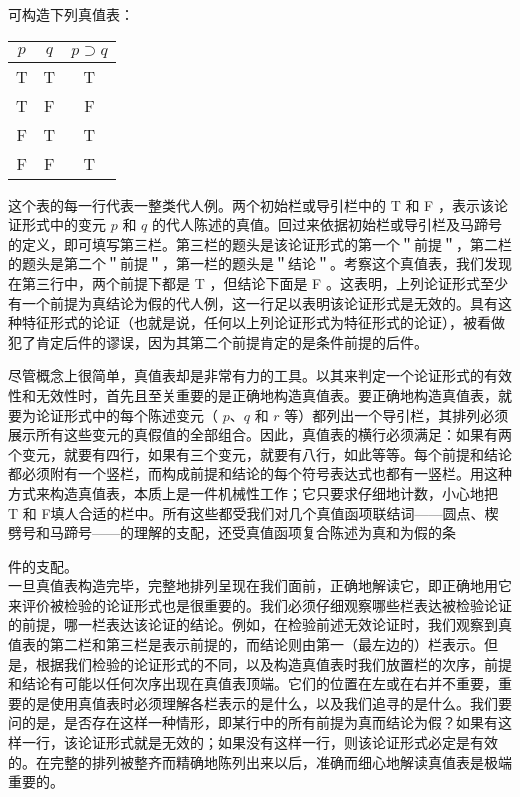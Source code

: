 可构造下列真值表：

\begin{center}
\begin{tabular}{|ccc|}
\hline
$p$ & $q$ & $p \supset q$ \\
\hline
T & T & T \\
T & F & F \\
F & T & T \\
F & F & T \\
\hline
\end{tabular}
\end{center}

这个表的每一行代表一整类代人例。两个初始栏或导引栏中的 T 和 F ，表示该论证形式中的变元 $p$ 和 $q$ 的代人陈述的真值。回过来依据初始栏或导引栏及马蹄号的定义，即可填写第三栏。第三栏的题头是该论证形式的第一个＂前提＂，第二栏的题头是第二个＂前提＂，第一栏的题头是＂结论＂。考察这个真值表，我们发现在第三行中，两个前提下都是 T ，但结论下面是 F 。这表明，上列论证形式至少有一个前提为真结论为假的代人例，这一行足以表明该论证形式是无效的。具有这种特征形式的论证（也就是说，任何以上列论证形式为特征形式的论证），被看做犯了肯定后件的谬误，因为其第二个前提肯定的是条件前提的后件。

尽管概念上很简单，真值表却是非常有力的工具。以其来判定一个论证形式的有效性和无效性时，首先且至关重要的是正确地构造真值表。要正确地构造真值表，就要为论证形式中的每个陈述变元（ $p 、 q$ 和 $r$ 等）都列出一个导引栏，其排列必须展示所有这些变元的真假值的全部组合。因此，真值表的横行必须满足：如果有两个变元，就要有四行，如果有三个变元，就要有八行，如此等等。每个前提和结论都必须附有一个竖栏，而构成前提和结论的每个符号表达式也都有一竖栏。用这种方式来构造真值表，本质上是一件机械性工作；它只要求仔细地计数，小心地把 T 和 F填人合适的栏中。所有这些都受我们对几个真值函项联结词——圆点、楔劈号和马蹄号——的理解的支配，还受真值函项复合陈述为真和为假的条

件的支配。\\
一旦真值表构造完毕，完整地排列呈现在我们面前，正确地解读它，即正确地用它来评价被检验的论证形式也是很重要的。我们必须仔细观察哪些栏表达被检验论证的前提，哪一栏表达该论证的结论。例如，在检验前述无效论证时，我们观察到真值表的第二栏和第三栏是表示前提的，而结论则由第一（最左边的）栏表示。但是，根据我们检验的论证形式的不同，以及构造真值表时我们放置栏的次序，前提和结论有可能以任何次序出现在真值表顶端。它们的位置在左或在右并不重要，重要的是使用真值表时必须理解各栏表示的是什么，以及我们追寻的是什么。我们要问的是，是否存在这样一种情形，即某行中的所有前提为真而结论为假？如果有这样一行，该论证形式就是无效的；如果没有这样一行，则该论证形式必定是有效的。在完整的排列被整齐而精确地陈列出来以后，准确而细心地解读真值表是极端重要的。

